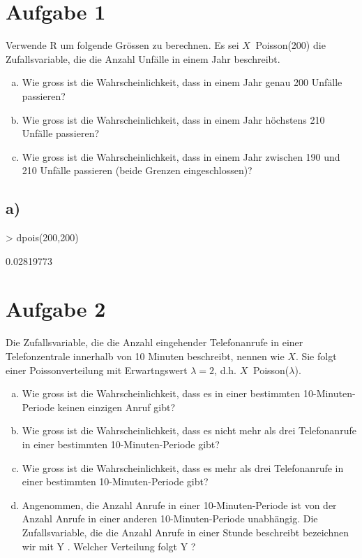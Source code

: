 \section{Aufgabe 1}
Verwende R um folgende Grössen zu berechnen. Es sei $X ~$ Poisson(200) die
Zufallsvariable, die die Anzahl Unfälle in einem Jahr beschreibt.

\begin{enumerate}[(a)]
	\item Wie gross ist die Wahrscheinlichkeit, dass in einem Jahr genau
          200 Unfälle passieren?
	\item Wie gross ist die Wahrscheinlichkeit, dass in einem Jahr höchstens
          210 Unfälle passieren?
    \item Wie gross ist die Wahrscheinlichkeit, dass in einem Jahr zwischen
          190 und 210 Unfälle passieren (beide Grenzen eingeschlossen)?
\end{enumerate}

\subsection*{a)}
\begin{Schunk}
\begin{Sinput}
> dpois(200,200)
\end{Sinput}
\begin{Soutput}
[1] 0.02819773
\end{Soutput}
\end{Schunk}

\section{Aufgabe 2}
Die Zufallsvariable, die die Anzahl eingehender Telefonanrufe in einer 
Telefonzentrale innerhalb von 10 Minuten beschreibt, nennen wie $X$.
Sie folgt einer Poissonverteilung mit Erwartngswert $\lambda = 2$, d.h.
$X ~$ Poisson($\lambda$).

\begin{enumerate}[(a)]
	\item Wie gross ist die Wahrscheinlichkeit, dass es in einer 
          bestimmten 10-Minuten-Periode keinen einzigen Anruf gibt?
    \item Wie gross ist die Wahrscheinlichkeit, dass es nicht mehr als drei 
          Telefonanrufe in einer bestimmten 10-Minuten-Periode gibt?
    \item Wie gross ist die Wahrscheinlichkeit, dass es mehr als drei 
          Telefonanrufe in einer bestimmten 10-Minuten-Periode gibt?
    \item Angenommen, die Anzahl Anrufe in einer 10-Minuten-Periode ist von 
          der Anzahl Anrufe in einer anderen 10-Minuten-Periode unabhängig. 
          Die Zufallsvariable, die die Anzahl Anrufe in einer Stunde 
          beschreibt bezeichnen wir mit Y . Welcher Verteilung folgt Y ?
\end{enumerate}


